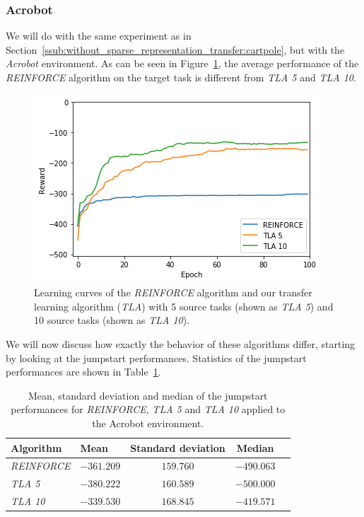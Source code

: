 \subsubsection{Acrobot} %
\label{ssub:without_sparse_representation_transfer:acrobot}
We will do with the same experiment as in Section~\ref{ssub:without_sparse_representation_transfer:cartpole}, but with the \textit{Acrobot} environment.
As can be seen in Figure~\ref{fig:Acrobot:reward_target_re-akt5-akt10}, the average performance of the \textit{REINFORCE} algorithm on the target task is different from \textit{TLA 5} and \textit{TLA 10}.
\begin{figure}[htb]
    \centering
    \includegraphics[width=.8\linewidth]{images/results/Acrobot/no_sparse_transfer/reward_target_re-akt5-akt10.png}
    \caption[Learning curves for the \textit{Acrobot} environment of \textit{REINFORCE} and \textit{TLA} for the \emph{Acrobot} environment]{Learning curves of the \textit{REINFORCE} algorithm and our transfer learning algorithm (\textit{TLA}) with 5 source tasks (shown as \textit{TLA 5}) and 10 source tasks (shown as \textit{TLA 10}).}
    \label{fig:Acrobot:reward_target_re-akt5-akt10}
\end{figure}
We will now discuss how exactly the behavior of these algorithms differ, starting by looking at the jumpstart performances. Statistics of the jumpstart performances are shown in Table~\ref{tab:acrobot:nosparse:stats}.
\begin{table}[htb]
    \centering
    \begin{tabular}{llccc}
    \hline
    Algorithm & Mean & Standard deviation & Median \\
    \hline
       \textit{REINFORCE}  & $-361.209$ & $\bm{159.760}$ & $-490.063$ \\
       \textit{TLA 5} & $-380.222$ & $160.589$ & $-500.000$ \\
       \textit{TLA 10} & $\bm{-339.530}$ & $168.845$ & $\bm{-419.571}$ \\
    \hline
    \end{tabular}
    \caption{Mean, standard deviation and median of the jumpstart performances for \textit{REINFORCE}, \textit{TLA 5} and \textit{TLA 10} applied to the Acrobot environment.}
    \label{tab:acrobot:nosparse:stats}
\end{table}
